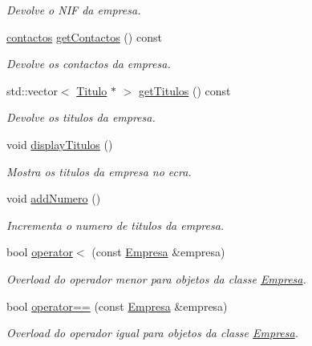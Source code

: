 \begin{DoxyCompactItemize}
\begin{DoxyCompactList}\small\item\em Devolve o N\+IF da empresa. \end{DoxyCompactList}\item 
\hyperlink{structcontactos}{contactos} \hyperlink{classEmpresa_a19396f860d9b17f94bd262ba093d76eb}{get\+Contactos} () const
\begin{DoxyCompactList}\small\item\em Devolve os contactos da empresa. \end{DoxyCompactList}\item 
std\+::vector$<$ \hyperlink{classTitulo}{Titulo} $\ast$ $>$ \hyperlink{classEmpresa_a672f3a89b0e41dd758ab6baf1a8dfbd2}{get\+Titulos} () const
\begin{DoxyCompactList}\small\item\em Devolve os titulos da empresa. \end{DoxyCompactList}\item 
void \hyperlink{classEmpresa_af067f4d00a5ceb8816a607164916d2e1}{display\+Titulos} ()
\begin{DoxyCompactList}\small\item\em Mostra os titulos da empresa no ecra. \end{DoxyCompactList}\item 
void \hyperlink{classEmpresa_a3e40c710d76874bcfcf4bd83592d4f13}{add\+Numero} ()
\begin{DoxyCompactList}\small\item\em Incrementa o numero de titulos da empresa. \end{DoxyCompactList}\item 
bool \hyperlink{classEmpresa_ab643d752365e59fa1d90a41b8a036d6a}{operator$<$} (const \hyperlink{classEmpresa}{Empresa} \&empresa)
\begin{DoxyCompactList}\small\item\em Overload do operador menor para objetos da classe \hyperlink{classEmpresa}{Empresa}. \end{DoxyCompactList}\item 
bool \hyperlink{classEmpresa_ad915fb38bc6c73c02fe70c62db1c9f03}{operator==} (const \hyperlink{classEmpresa}{Empresa} \&empresa)
\begin{DoxyCompactList}\small\item\em Overload do operador igual para objetos da classe \hyperlink{classEmpresa}{Empresa}. \end{DoxyCompactList}\end{DoxyCompactItemize}


